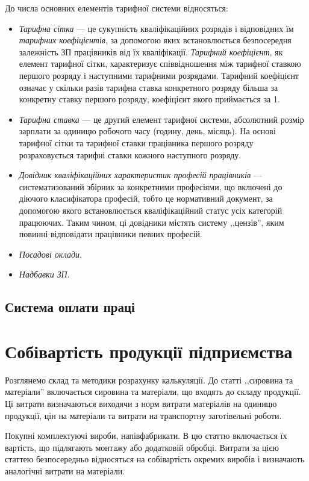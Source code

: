 \documentclass[a5paper,10pt,notitlepage,pdftex,headsepline]{scrartcl}
\begin{document}
    До числа основних елементів тарифної системи відносяться:
    \begin{itemize}
      \item \emph{Тарифна сітка} --- це сукупність кваліфікаційних розрядів і
        відповідних їм \emph{тарифних коефіцієнтів}, за допомогою яких
        встановлюється безпосередня залежність ЗП працівників від їх
        кваліфікації.
        \emph{Тарифний коефіцієнт}, як елемент тарифної сітки, характеризує
        співвідношення між тарифної ставкою першого розряду і наступними
        тарифними розрядами.
        Тарифний коефіцієнт означає у скільки разів тарифна ставка конкретного
        розряду більша за конкретну ставку першого розряду, коефіцієнт якого
        приймається за 1.
      \item \emph{Тарифна ставка} --- це другий елемент тарифної системи,
        абсолютний розмір зарплати за одиницю робочого часу (годину, день,
        місяць).
        На основі тарифної сітки та тарифної ставки працівника першого розряду
        розраховується тарифні ставки кожного наступного розряду.
      \item \emph{Довідник кваліфікаційних характеристик професій працівників}
        --- систематизований збірник за конкретними професіями, що включені до
        діючого класифікатора професій, тобто це нормативний документ, за
        допомогою якого встановлюється кваліфікаційний статус усіх категорій
        працюючих.
        Таким чином, ці довідники містять систему ,,цензів'', яким повинні
        відповідати працівники певних професій.
      \item \emph{Посадові оклади}.
      \item \emph{Надбавки ЗП}.
    \end{itemize}
  \subsection{Система оплати праці}
\section{Собівартість продукції підприємства}
  Розглянемо склад та методики розрахунку калькуляції.
  До статті ,,сировина та матеріали'' включається сировина та матеріали, що
  входять до складу продукції.
  Ці витрати визначаються виходячи з норм витрати матеріалів на одиницю
  продукції, цін на матеріали та витрати на транспортну заготівельні роботи.

  Покупні комплектуючі вироби, напівфабрикати. В цю статтю включається їх
  вартість, що підлягають монтажу або додатковій обробці.
  Витрати за цією статтею безпосередньо відносяться на собівартість окремих
  виробів і визначають аналогічні витрати на матеріали.
\end{document}
